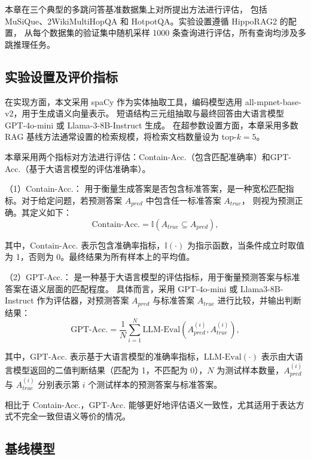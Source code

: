 本章在三个典型的多跳问答基准数据集上对所提出方法进行评估，
包括 MuSiQue、2WikiMultiHopQA 和 HotpotQA。实验设置遵循 HippoRAG2 的配置，
从每个数据集的验证集中随机采样 1000 条查询进行评估，所有查询均涉及多跳推理任务。

\subsection{实验设置及评价指标}

在实现方面，本文采用 spaCy 作为实体抽取工具，编码模型选用 all-mpnet-base-v2，用于生成语义向量表示。
短语结构三元组抽取与最终回答由大语言模型 GPT-4o-mini 或 Llama-3-8B-Instruct 生成。
在超参数设置方面，本章采用多数 RAG 基线方法\cite{hipporag,hipporag2,linearrag}通常设置的检索规模，将检索文档数量设为 top-$k=5$。

本章采用两个指标对方法进行评估：Contain-Acc.（包含匹配准确率）和GPT-Acc.（基于大语言模型的评估准确率）。

（1）Contain-Acc.：
用于衡量生成答案是否包含标准答案，是一种宽松匹配指标。对于给定问题，若预测答案 $A_{pred}$ 中包含任一标准答案 $A_{true}$，
则视为预测正确。其定义如下：
\begin{equation}
\text{Contain-Acc.} = \mathbb{I}(A_{true} \subseteq A_{pred}),
\end{equation}

\noindent 其中，$\text{Contain-Acc.}$ 表示包含准确率指标，$\mathbb{I}(\cdot)$ 为指示函数，当条件成立时取值为 1，否则为 0。最终结果为所有样本上的平均值。

（2）GPT-Acc.：
是一种基于大语言模型的评估指标，用于衡量预测答案与标准答案在语义层面的匹配程度。
具体而言，采用 GPT-4o-mini 或 Llama3-8B-Instruct 作为评估器，对预测答案 $A_{pred}$ 与标准答案 $A_{true}$ 进行比较，并输出判断结果：
\begin{equation}
\text{GPT-Acc.} = \frac{1}{N} \sum_{i=1}^{N} \text{LLM-Eval}(A_{pred}^{(i)}, A_{true}^{(i)}),
\end{equation}

\noindent 其中，$\text{GPT-Acc.}$ 表示基于大语言模型的准确率指标，$\text{LLM-Eval}(\cdot)$ 表示由大语言模型返回的二值判断结果（匹配为 1，不匹配为 0），$N$ 为测试样本数量，$A_{pred}^{(i)}$ 与 $A_{true}^{(i)}$ 分别表示第 $i$ 个测试样本的预测答案与标准答案。

相比于 Contain-Acc.，GPT-Acc. 能够更好地评估语义一致性，尤其适用于表达方式不完全一致但语义等价的情况。

\subsection{基线模型}

